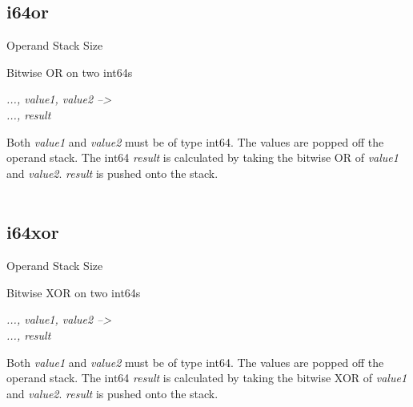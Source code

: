 \documentclass[12pt]{article}
\begin{document}
		\newpage
		\subsection*{i64or}
			\begin{labeling}{Operand Stack Size}
				\item [\textbf{Operation}] Bitwise OR on two int64s
				\item [\textbf{Format}] 
				\item [\textbf{Operand Stack}] \textit{..., value1, value2 --\textgreater } \\
										\textit{..., result}
				\item [\textbf{Description}] Both \textit{value1} and \textit{value2} must be of type int64. The values are popped off the operand stack. The int64 \textit{result} is calculated by taking the bitwise OR of \textit{value1} and \textit{value2}. \textit{result} is pushed onto the stack. \\ \\
			\end{labeling}	
			
		\newpage
		\subsection*{i64xor}
			\begin{labeling}{Operand Stack Size}
				\item [\textbf{Operation}] Bitwise XOR on two int64s
				\item [\textbf{Format}] 
				\item [\textbf{Operand Stack}] \textit{..., value1, value2 --\textgreater } \\
										\textit{..., result}
				\item [\textbf{Description}] Both \textit{value1} and \textit{value2} must be of type int64. The values are popped off the operand stack. The int64 \textit{result} is calculated by taking the bitwise XOR of \textit{value1} and \textit{value2}. \textit{result} is pushed onto the stack. \\ \\
			\end{labeling}	
			
		\newpage
\end{document}
